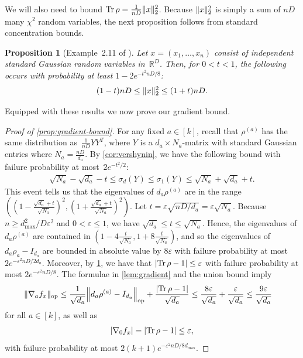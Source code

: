 \documentclass[aos]{imsart}
\newtheorem{prop}[theorem]{Proposition}
\theoremstyle{definition}
\numberwithin{equation}{section}
\DeclareMathOperator{\op}{op}
\DeclareMathOperator{\tr}{Tr}
\DeclarePairedDelimiter{\abs}{\lvert}{\rvert}
\DeclarePairedDelimiter{\norm}{\lVert}{\rVert}
\newcommand{\R}{{\mathbb{R}}}
\newcommand{\eps}{\varepsilon}
\newcommand{\rv}{x}
\def\dmax{d_{\max}}
\begin{document}
We will also need to bound $\tr\rho = \frac1{nD} \norm x_2^2$.
Because $\norm x_2^2$ is simply a sum of $nD$ many $\chi^2$ random variables, the next proposition follows from standard concentration bounds.

\begin{prop}[Example~2.11 of \cite{W19}]\label{prp:xnorm}
Let $\rv = (\rv_1,\dots,\rv_n)$ consist of independent standard Gaussian random variables in~$\R^D$.
Then, for $0 < t < 1$, the following occurs with probability at least $1 - 2e^{-t^2 nD/8}$:
\begin{align*}
  (1 - t) nD \leq \norm{x}_2^2 \leq (1 + t) nD.
\end{align*}
\end{prop}

Equipped with these results we now prove our gradient bound.

\begin{proof}[Proof of \cref{prop:gradient-bound}]
For any fixed $a\in[k]$, recall that $\rho^{(a)}$ has the same distribution as~$\frac1{nD} YY^T$, where $Y$ is a $d_a\times N_a$-matrix with standard Gaussian entries where $N_{a} = \frac{nD}{d_{a}}$.
By \cref{cor:vershynin}, we have the following bound with failure probability at most~$2 e^{-t^2/2}$:
\begin{align*}
  \sqrt{N_a} - \sqrt{d_a} - t \leq \sigma_d(Y) \leq \sigma_1(Y) \leq \sqrt{N_a} + \sqrt{d_a} + t.
\end{align*}
This event tells us that the eigenvalues of $d_a \rho^{(a)}$ are in the range $( (1 - \frac{\sqrt{d_a} + t}{\sqrt{N_a}})^2, (1 + \frac{\sqrt{d_a} + t}{\sqrt{N_a}})^2)$.
Let $t = \eps \sqrt{n D / d_a} = \eps \sqrt{N_a}$.
Because $n \geq \dmax^{2}/D\eps^{2}$ and $0 < \eps \leq 1$, we have $\sqrt{d_{a}} \leq t \leq \sqrt{N_a}$.
Hence, the eigenvalues of $d_a \rho^{(a)}$ are contained in $( 1 - 4\frac{t}{\sqrt{N_a}}, 1 + 8 \frac{ t}{\sqrt{N_a}})$, and so the eigenvalues of $d_{a} \rho_{a} - I_{d_{a}}$ are bounded in absolute value by
$8\eps$
with failure probability at most~$2e^{-\eps^{2} n D / 2 d_{a}}$.
Moreover, by \cref{prp:xnorm}, we have that $\abs{\tr \rho - 1} \leq \eps$ with failure probability at most $2e^{-\eps^{2} n D / 8}$.
The formulae in \cref{lem:gradient} and the union bound imply
\begin{align*}
  \norm{\nabla_a f_x}_{\op}
&\leq\frac{1}{\sqrt{d_a}} \norm*{d_{a} \rho^{(a)} - I_{d_a}}_{\op} + \frac{\abs{\tr\rho - 1}}{\sqrt{d_a}}
\leq \frac{8\eps}{\sqrt{d_a}} + \frac{\eps}{\sqrt{d_a}}
\leq \frac{9\eps}{\sqrt{d_a}}
\end{align*}
for all $a\in[k]$, as well as
\begin{align*}
  \abs{\nabla_0 f_x}
= \abs{\tr \rho - 1}
\leq \eps,
\end{align*}
with failure probability at most $2 (k+1) e^{-\eps^{2} n D / 8 \dmax}$.
\end{proof}
\end{document}
